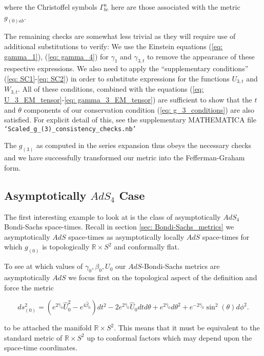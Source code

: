 \documentclass[a4paper,11pt]{article}
\numberwithin{equation}{section}
\begin{document}
\noindent where the Christoffel symbols $\Gamma^{a}_{bc}$ here are those associated with the metric $g_{(0)ab}$. \par

The remaining checks are somewhat less trivial as they will require use of additional substitutions to verify: We use the Einstein equations (\ref{eq: gamma_1}), (\ref{eq: gamma_4}) for $\gamma_1$ and $\gamma_{3,t}$ to remove the appearance of these respective expressions. We also need to apply the ``supplementary conditions'' (\ref{eq: SC1}-\ref{eq: SC2}) in order to substitute expressions for the functions $U_{3,t}$ and $W_{3,t}$. All of these conditions, combined with the equations (\ref{eq: U_3_EM_tensor}-\ref{eq: gamma_3_EM_tensor}) are sufficient to show that the $t$ and $\theta$ components of our conservation condition (\ref{eq: g_3_conditions}) are also satisfied. For explicit detail of this, see the supplementary MATHEMATICA file \texttt{`Scaled\_g\_(3)\_consistency\_checks.nb'} \par

The $g_{(3)}$ as computed in the series expansion thus obeys the necessary checks and we have successfully transformed our metric into the Fefferman-Graham form.  

\subsection{Asymptotically $AdS_4$ Case}

The first interesting example to look at is the class of asymptotically $AdS_4$ Bondi-Sachs space-times. Recall in section \ref{sec: Bondi-Sachs_metrics} we asymptotically $AdS$ space-times as asymptotically locally $AdS$ space-times for which $g_{(0)}$ is topologically $\mathbb{R} \times S^2$ and conformally flat. \par

To see at which values of $\gamma_0, \beta_0, U_0$ our $AdS$-Bondi-Sachs metrics are asymptotically $AdS$ we focus first on the topological aspect of the definition and force the metric

\begin{equation} 
ds_{(0)}^2=(e^{2\hat{\gamma}_{0}}\hat{U}_{0}^2-e^{4\hat{\beta}_{0}})dt^2-2e^{2\hat{\gamma}_{0}}\hat{U}_{0}dtd\theta+e^{2\hat{\gamma}_{0}}d\theta^2+e^{-2\hat{\gamma}_{0}}\sin^2(\theta)d\phi^2.
\end{equation}

\noindent to be attached the manifold $\mathbb{R} \times S^2$. This means that it must be equivalent to the standard metric of $\mathbb{R} \times S^2$ up to conformal factors which may depend upon the space-time coordinates.  \par 
\end{document}
